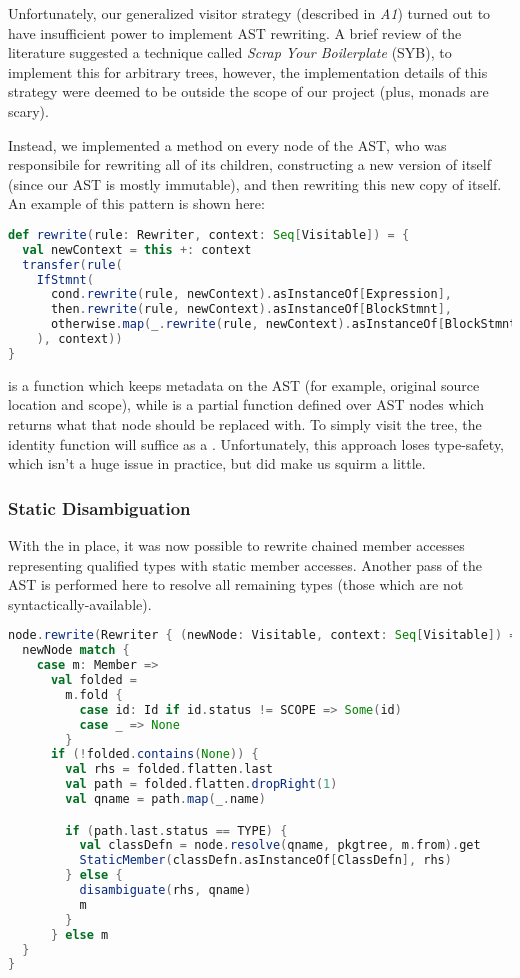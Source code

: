 \documentclass{article}
\begin{document}
Unfortunately, our generalized visitor strategy (described in \textit{A1}) turned out to have insufficient power to
implement AST rewriting. A brief review of the literature suggested a technique called \textit{Scrap Your Boilerplate}
(SYB), to implement this for arbitrary trees, however, the implementation details of this strategy were deemed to be
outside the scope of our project (plus, monads are scary).

Instead, we implemented a  method on every node of the AST, who was responsibile for rewriting all of its
children, constructing a new version of itself (since our AST is mostly immutable), and then rewriting this new copy of
itself. An example of this pattern is shown here:

\begin{lstlisting}[language=Scala]
def rewrite(rule: Rewriter, context: Seq[Visitable]) = {
  val newContext = this +: context
  transfer(rule(
    IfStmnt(
      cond.rewrite(rule, newContext).asInstanceOf[Expression],
      then.rewrite(rule, newContext).asInstanceOf[BlockStmnt],
      otherwise.map(_.rewrite(rule, newContext).asInstanceOf[BlockStmnt])
    ), context))
}
\end{lstlisting}

 is a function which keeps metadata on the AST (for example, original source location and scope), while
 is a partial function defined over AST nodes which returns what that node should be replaced with. To simply
visit the tree, the identity function will suffice as a . Unfortunately, this approach loses type-safety,
which isn't a huge issue in practice, but did make us squirm a little.


\subsubsection{Static Disambiguation}
With the  in place, it was now possible to rewrite chained member accesses representing qualified
types with static member accesses. Another pass of the AST is performed here to resolve all remaining types (those which
are not syntactically-available).

\begin{lstlisting}[language=Scala]
node.rewrite(Rewriter { (newNode: Visitable, context: Seq[Visitable]) =>
  newNode match {
    case m: Member =>
      val folded =
        m.fold {
          case id: Id if id.status != SCOPE => Some(id)
          case _ => None
        }
      if (!folded.contains(None)) {
        val rhs = folded.flatten.last
        val path = folded.flatten.dropRight(1)
        val qname = path.map(_.name)

        if (path.last.status == TYPE) {
          val classDefn = node.resolve(qname, pkgtree, m.from).get
          StaticMember(classDefn.asInstanceOf[ClassDefn], rhs)
        } else {
          disambiguate(rhs, qname)
          m
        }
      } else m
  }
}
\end{lstlisting}
\end{document}
